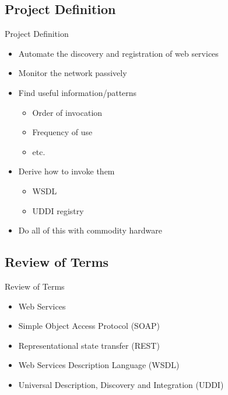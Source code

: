 \documentclass{beamer}
\begin{document}

\subsection{Project Definition}
\begin{frame}{Project Definition}
    \begin{itemize}
        \item Automate the discovery and registration of web services
        \item Monitor the network passively
        \item Find useful information/patterns
        \begin{itemize}
            \item Order of invocation
            \item Frequency of use
            \item etc.
        \end{itemize}
        \item Derive how to invoke them
        \begin{itemize}
            \item WSDL
            \item UDDI registry
        \end{itemize}
        \item Do all of this with commodity hardware
    \end{itemize}
\end{frame}


\subsection{Review of Terms}
\begin{frame}{Review of Terms}
    \begin{itemize}
        \item Web Services
        \item Simple Object Access Protocol (SOAP)
        \item Representational state transfer (REST)
        \item Web Services Description Language (WSDL)
        \item Universal Description, Discovery and Integration (UDDI)
    \end{itemize}
\end{frame}
\end{document}
